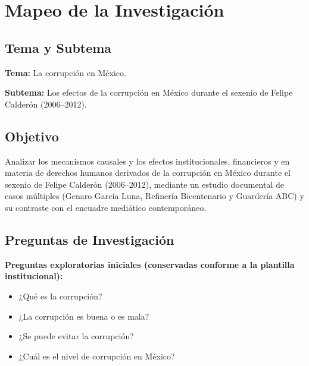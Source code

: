 \documentclass[12pt,letterpaper,oneside]{article}
\begin{document}
\tableofcontents
\clearpage

\listoftables
\clearpage

\listoffigures
\clearpage


\section*{Mapeo de la Investigación}

\subsection*{Tema y Subtema}

\textbf{Tema:} La corrupción en México.

\textbf{Subtema:} Los efectos de la corrupción en México durante el sexenio de Felipe Calderón (2006--2012).

\subsection*{Objetivo}

Analizar los mecanismos causales y los efectos institucionales, financieros y en materia de derechos humanos derivados de la corrupción en México durante el sexenio de Felipe Calderón (2006--2012), mediante un estudio documental de casos múltiples (Genaro García Luna, Refinería Bicentenario y Guardería ABC) y su contraste con el encuadre mediático contemporáneo.

\subsection*{Preguntas de Investigación}

\textbf{Preguntas exploratorias iniciales (conservadas conforme a la plantilla institucional):}

\begin{itemize}
  \item ¿Qué es la corrupción?
  \item ¿La corrupción es buena o es mala?
  \item ¿Se puede evitar la corrupción?
  \item ¿Cuál es el nivel de corrupción en México?
\end{itemize}
\end{document}
